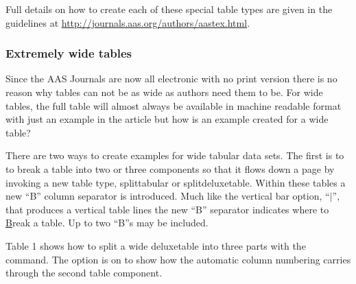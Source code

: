 \documentclass[linenumbers,trackchanges]{aastex701}
\begin{document}
Full details on how to create each of these special table types are given in the guidelines at \url{http://journals.aas.org/authors/aastex.html}.

\subsubsection{Extremely wide tables}

Since the AAS Journals are now all electronic with no print version there is no reason why tables can not be as wide as authors need them to be. For wide tables, the full table will almost always be available in machine readable format with just an example in the article but how is an example created for a wide table?

There are two ways to create examples for wide tabular data sets. The first is to to break a table into two or three components so that it flows down a page by invoking a new table type, splittabular or splitdeluxetable. Within these tables a new ``B'' column separator is introduced.  Much like the vertical bar option, ``$\vert$'', that produces a vertical table lines the new ``B'' separator indicates where to \underline{B}reak a table.  Up to two ``B''s may be included.

Table 1 shows how to split a wide deluxetable into three parts with
the {\tt\string\splitdeluxetable} command.  The {\tt\string\colnumbers}
option is on to show how the automatic column numbering carries through the
second table component.
\end{document}
